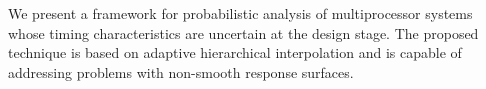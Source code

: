 We present a framework for probabilistic analysis of multiprocessor systems
whose timing characteristics are uncertain at the design stage. The proposed
technique is based on adaptive hierarchical interpolation and is capable of
addressing problems with non-smooth response surfaces.
